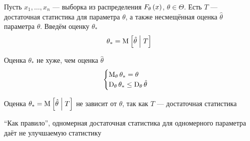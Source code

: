 \begin{theorem}
    Пусть $x_1, \dots, x_n$ --- выборка из распределения $F_{\theta}\left(x\right)$,
    $\theta \in \Theta$.
    Есть $T$ --- достаточная статистика для параметра $\theta$,
    а также несмещённая оценка $\hat{\theta}$ параметра $\theta$.
    Введём оценку $\theta_*$
    $$\theta_* = \operatorname{M}_{} \left[ \hat{\theta} \;\middle|\; T \right]$$

    Оценка $\theta_*$ не хуже, чем оценка $\hat{\theta}$
    $$\begin{cases}
        \operatorname{M}_{\theta} \theta_* = \theta \\
        \operatorname{D}_{\theta} \theta_* \le \operatorname{D}_{\theta} \hat{\theta}
    \end{cases}$$
\end{theorem}

\begin{remark}
    Оценка $\theta_* = \operatorname{M}_{} \left[ \hat{\theta} \;\middle|\; T \right]$ не зависит от $\theta$,
    так как $T$ --- достаточная статистика
\end{remark}

\begin{remark}
    ``Как правило'', одномерная достаточная статистика
    для одномерного параметра даёт не улучшаемую статистику
\end{remark}

